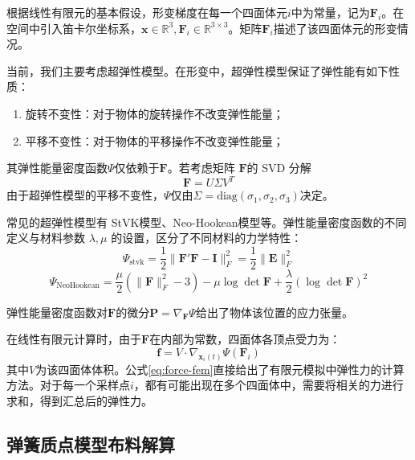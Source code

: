 根据线性有限元的基本假设，形变梯度在每一个四面体元$i$中为常量，记为$\mathbf F_i$。在空间中引入笛卡尔坐标系，$\mathbf x \in {\mathbb R}^3, \mathbf F_i \in \mathbb{R} ^{3\times 3}$。矩阵$\mathbf F_i$描述了该四面体元的形变情况。

当前，我们主要考虑超弹性模型。在形变中，超弹性模型保证了弹性能有如下性质：
\begin{enumerate}
  \item 旋转不变性：对于物体的旋转操作不改变弹性能量；
  \item 平移不变性：对于物体的平移操作不改变弹性能量；
\end{enumerate}
其弹性能量密度函数$\Psi$仅依赖于$\mathbf F$。若考虑矩阵 $\mathbf F$的 SVD 分解
\begin{equation}\label{eq:def-grad-svd}
  \mathbf F = U \Sigma V^T
\end{equation}
由于超弹性模型的平移不变性，$\Psi$仅由$\Sigma=\mathrm{diag}(\sigma_1, \sigma_2, \sigma_3)$决定。

常见的超弹性模型有 StVK模型、Neo-Hookean模型等。弹性能量密度函数的不同定义与材料参数 $\lambda, \mu$ 的设置，区分了不同材料的力学特性：
\begin{equation}\label{eq:stvk-phi}
  \Psi_{\mathrm{stvk}} = \frac{1}{2} \| \mathbf F' \mathbf F - \mathbf I\|_F^2 = \frac{1}{2} \|\mathbf E\|_F^2 
\end{equation}
\begin{equation}
  \label{eq:neohookean-phi}
  \Psi_{\mathrm{NeoHookean}} = \frac{\mu}{2} (\|\mathbf F\|_F^2 - 3)- \mu \log \det \mathbf F + \frac{\lambda}{2}\left(\log{\det \mathbf F}\right) ^2
\end{equation}

弹性能量密度函数对$\mathbf F$的微分$\mathbf P = \nabla_{\mathbf F} \Psi$给出了物体该位置的应力张量。

在线性有限元计算时，由于$\mathbf F$在内部为常数，四面体各顶点受力为：
\begin{equation}
  \mathbf f =V\cdot \nabla_{\mathbf x_i(t)} \Psi(\mathbf F_i)\label{eq:force-fem}
\end{equation}
其中$V$为该四面体体积。公式\ref{eq:force-fem}直接给出了有限元模拟中弹性力的计算方法。对于每一个采样点$i$，都有可能出现在多个四面体中，需要将相关的力进行求和，得到汇总后的弹性力。

\subsection{弹簧质点模型布料解算}

